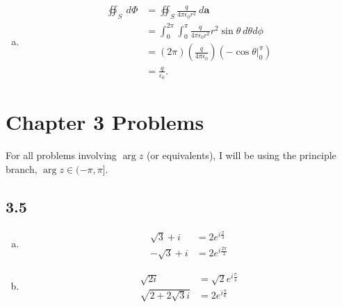 \documentclass[10pt]{mypackage}
\begin{document}
\begin{enumerate}[(a)]
\begin{center}
      \end{center}
    \item 
      \begin{align*}
        \oiint_{S}^{} \:d\Phi &= \oiint_{S}^{} \frac{q}{4\pi \epsilon_0 r^2}\:d\mathbf{a}\\
                              &= \int_{0}^{2\pi}\int_{0}^{\pi}\frac{q}{4\pi \epsilon_0 r^2}r^2\sin\theta\:d\theta d\phi\\
                              &= \left(2\pi\right)\left(\frac{q}{4\pi \epsilon_0}\right)\left(-\cos\theta\bigr\vert_{0}^{\pi}\right)\\
                              &= \frac{q}{\epsilon_0}.
      \end{align*}
\end{enumerate}
\section{Chapter 3 Problems}%
For all problems involving $\arg z$ (or equivalents), I will be using the principle branch, $\arg z \in (-\pi,\pi]$.
\subsection{3.5}%
\begin{enumerate}[(a)]
  \item
    \begin{align*}
      \sqrt{3} + i &= 2e^{i\frac{\pi}{3}}\\
      -\sqrt{3} + i &= 2e^{i\frac{2\pi}{3}}
    \end{align*}
  \item 
    \begin{align*}
      \sqrt{2i} &= \sqrt{2}e^{i \frac{\pi}{4}}\\
      \sqrt{2 + 2\sqrt{3}i} &= 2e^{i \frac{\pi}{6}}
    \end{align*}
\end{enumerate}
\end{document}
